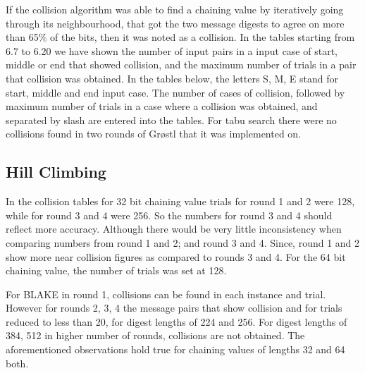 If the collision algorithm was able to find a chaining value by iteratively going through its neighbourhood, that got
the two message digests to agree on more than 65\% of the bits, then it was noted as a collision. In the tables
starting from 6.7 to 6.20 we have shown the number of input pairs in a input case of start, middle or end that
showed collision, and the maximum number of trials in a pair that collision was obtained. In the tables below, the
letters S, M, E stand for start, middle and end input case. The number of cases of collision, followed by maximum number
of trials in a case where a collision was obtained, and separated by slash are entered into the tables. For tabu search
there were no collisions found in two rounds of Gr{\o}stl that it was implemented on.

\subsection{Hill Climbing}

In the collision tables for 32 bit chaining value trials for round 1 and 2 were 128, while for round 3 and 4 were 256.
So the numbers for round 3 and 4 should reflect more accuracy. Although there would be very little inconsistency
when comparing numbers from round 1 and 2; and round 3 and 4. Since, round 1 and 2 show more near collision figures
as compared to rounds 3 and 4. For the 64 bit chaining value, the number of trials was set at 128.

For BLAKE in round 1, collisions can be found in each instance and trial. However for rounds 2, 3, 4 the message pairs
that show collision and for trials reduced to less than 20, for digest lengths of 224 and 256. For digest lengths of
384, 512 in higher number of rounds, collisions are not obtained. The aforementioned observations hold true for
chaining values of lengths 32 and 64 both.

